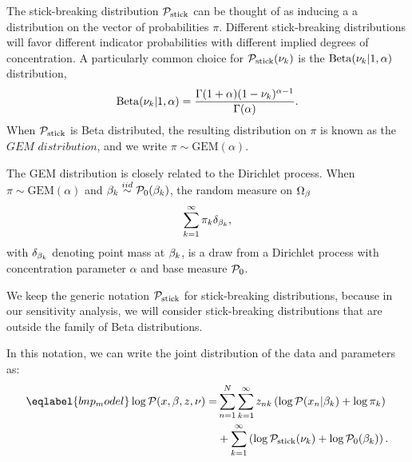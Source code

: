 The stick-breaking distribution $\mathcal{P}_{\mathrm{stick}}$ can be thought of as inducing a
a distribution on the vector of probabilities $\pi$. Different
stick-breaking distributions will favor different indicator probabilities
with different implied degrees of concentration.
A particularly common choice for
$\mathcal{P}_{\mathrm{stick}}(\nu_{k})$ is the $\mathrm{Beta}(\nu_{k} \vert 1, \alpha)$ distribution,
%
\begin{align*}
%
\mathrm{Beta}(\nuk \vert 1, \alpha) =
    \frac{\Gamma(1 + \alpha) (1 - \nuk)^{\alpha - 1}}
         {\Gamma(\alpha)}.
%
\end{align*}
%
When $\mathcal{P}_{\mathrm{stick}}$ is Beta distributed, the resulting distribution on $\pi$ is known as the
$\textit{GEM distribution}$, and we write $\pi \sim \mathrm{GEM}(\alpha)$.

The GEM distribution is closely related to the Dirichlet process.
When $\pi \sim \mathrm{GEM}(\alpha)$ and
$\beta_k \overset{iid}{\sim} \mathcal{P}_{0}(\beta_k)$,
the random measure on $\Omega_{\beta}$
\begin{align*}
  \sum_{k = 1}^\infty \pi_k\delta_{\beta_k},
\end{align*}
with $\delta_{\beta_k}$ denoting point mass at $\beta_k$,
is a draw from a Dirichlet process with concentration parameter $\alpha$
and base measure $\mathcal{P}_{0}$.

We keep the generic notation $\mathcal{P}_{\mathrm{stick}}$ for stick-breaking distributions,
because in our sensitivity analysis,
we will consider stick-breaking distributions that are outside the
family of Beta distributions.

In this notation, we can write the joint distribution of
the data and parameters as:
%
\begin{align}\eqlabel{bnp_model}
%
\logp(\x, \beta, \z, \nu) =&
\sum_{n=1}^N \sum_{k=1}^{\infty}
    \z_{\n\k} \left(
        \logp(\x_n \vert \beta_\k) + \log \pi_\k
    \right)
\nonumber\\
   & +
    \sum_{k=1}^{\infty} \left(
        \log \pstick(\nuk) + \log \pbetaprior(\beta_\k)
    \right).
%
\end{align}
%

